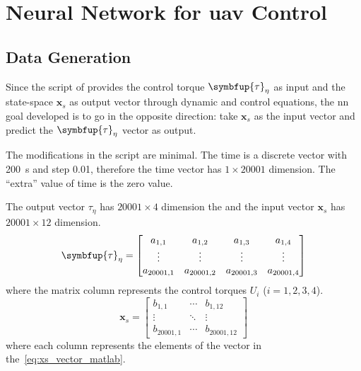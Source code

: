 \section{Neural Network for \gls*{uav} Control}

\subsection{Data Generation}

Since the script of \citet{geronel2023} provides the control torque \(\symbfup{\tau}_{\eta}\) as input and the state-space \(\symbf{x}_s\) as output vector through dynamic and control equations, the \gls*{nn} goal developed is to go in the opposite direction: take \(\symbf{x}_s\) as the input vector and predict the \(\symbfup{\tau}_{\eta}\) vector as output.

The modifications in the script are minimal.
The time is a discrete vector with \SI{200}{s} and step 0.01, therefore the time vector has \(1\times 20001\) dimension.
The ``extra'' value of time is the zero value.

The output vector \(\tau_{\eta}\) has \(20001\times 4\) dimension the and the input vector \(\symbf{x}_s\) has  \(20001\times 12\) dimension.
%
\begin{equation}\label{eq:tau_input}
    \symbfup{\tau}_{\eta} = \begin{bmatrix}
        a_{1,1}      & a_{1,2}      & a_{1,3}      & a_{1,4} \\
        \vdots       & \vdots       & \vdots       & \vdots  \\
        a_{20001, 1} & a_{20001, 2} & a_{20001, 3} & a_{20001, 4} 
    \end{bmatrix}
\end{equation}
%
where the matrix column represents the control torques \(U_i\) (\(i=1,2,3,4\)).
%
\begin{equation}\label{eq:xs_output}
    \symbf{x}_s = \begin{bmatrix}
        b_{1,1}      & \cdots & b_{1,12} \\
        \vdots       & \ddots & \vdots \\
        b_{20001, 1} & \cdots & b_{20001, 12} 
    \end{bmatrix}
\end{equation}
%
where each column represents the elements of the vector in the~\cref{eq:xs_vector_matlab}.

